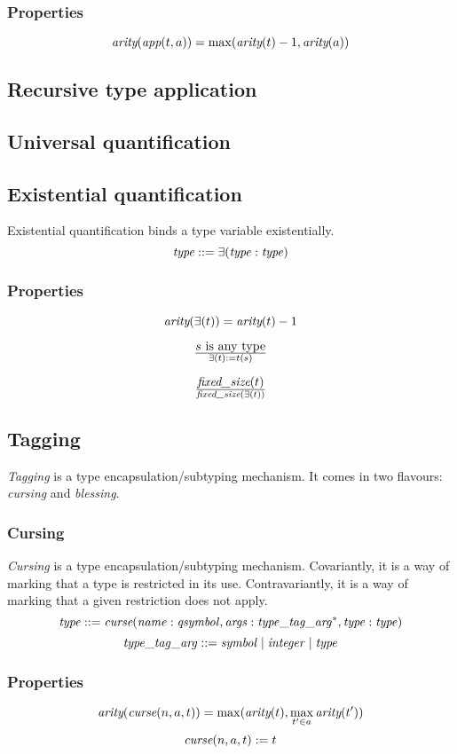 \documentclass[a4paper]{report}
\newcommand\arity{{\ensuremath\textit{arity}}}
\newcommand\fixedsize{{\ensuremath\textit{fixed\_size}}}
\newcommand\tyApp{{\ensuremath\textit{app}}}
\newcommand\tyCurse{{\ensuremath\textit{curse}}}
\begin{document}
\subsubsection*{Properties}
$$ \arity(\tyApp(t,a)) = \max(\arity(t)-1, \arity(a)) $$

\subsection{Recursive type application}
\subsection{Universal quantification}
\subsection{Existential quantification}
Existential quantification binds a type variable existentially.
$$ \it type ::= \exists(type : type) $$

\subsubsection*{Properties}
$$ \arity(\exists(t)) = \arity(t)-1 $$

$${s \textrm{ is any type}} \over \exists(t) := t(s)$$

$$\fixedsize(t) \over \fixedsize(\exists(t))$$

\subsection{Tagging}
\emph{Tagging} is a type encapsulation/subtyping mechanism.
It comes in two flavours: \emph{cursing} and \emph{blessing}.

\subsubsection{Cursing}
\emph{Cursing} is a type encapsulation/subtyping mechanism.
Covariantly, it is a way of marking that a type is restricted in its use.
Contravariantly, it is a way of marking that a given restriction does not apply.
$$
\it type ::= \tyCurse(name : qsymbol, args : type\_tag\_arg^*, type : type)
$$
$$
\it type\_tag\_arg ::= symbol \;|\; integer \;|\; type
$$

\subsubsection*{Properties}
$$
\arity(\tyCurse(n,a,t)) = \max(\arity(t), \max_{t' \in a} \arity(t'))
$$
$$
\tyCurse(n,a,t) := t
$$
\end{document}
